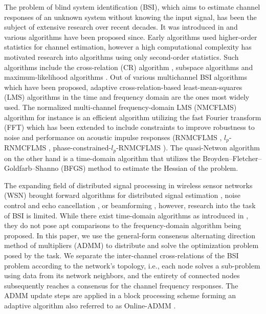 \documentclass{article}
\begin{document}
The problem of blind system identification (BSI), which aims to estimate channel responses of an unknown system without knowing the input signal, has been the subject of extensive research over recent decades.
It was introduced in \cite{satoMethodSelfRecoveringEqualization1975} and various algorithms have been proposed since.
Early algorithms used higher-order statistics \cite{godardSelfRecoveringEqualizationCarrier1980,tongNewApproachBlind1991,mendelTutorialHigherorderStatistics1991} for channel estimation, however a high computational complexity has motivated research into algorithms using only second-order statistics.
Such algorithms include the cross-relation (CR) algorithm \cite{langtongBlindIdentificationEqualization1994, guanghanxuLeastsquaresApproachBlind1995}, subspace algorithms \cite{moulinesSubspaceMethodsBlind1995,gannotSubspaceMethodsMultimicrophone2003,diamantarasEfficientSubspaceMethod2008,mayyalaStructureBasedSubspaceMethod2017} and maximum-likelihood algorithms \cite{yingbohuaFastMaximumLikelihood1996}.
Out of various multichannel BSI algorithms which have been proposed, adaptive cross-relation-based least-mean-squares (LMS) algorithms in the time and frequency domain are the ones most widely used.
The normalized multi-channel frequency-domain LMS (NMCFLMS) \cite{huangAdaptiveMultichannelLeast2002,huangClassFrequencydomainAdaptive2003} algorithm for instance is an efficient algorithm utilizing the fast Fourier transform (FFT) which has been extended to include constraints to improve robustness to noise and performance on acoustic impulse responses (RNMCFLMS \cite{huNoiseRobustBlind2015}, \(l_p\)-RNMCFLMS \cite{heNoiseRobustFrequencyDomain2018}, phase-constrained-\(l_p\)-RNMCFLMS \cite{joRobustBlindMultichannel2021}).
The quasi-Netwon algorithm \cite{habetsOnlineQuasiNewtonAlgorithm2010} on the other hand is a time-domain algorithm that utilizes the Broyden–Fletcher–Goldfarb–Shanno (BFGS) \cite{brodlie1977assessment} method to estimate the Hessian of the problem.

The expanding field of distributed signal processing in wireless sensor networks (WSN) brought forward algorithms for distributed signal estimation \cite{5483092}, noise control and echo cancellation \cite{9670697}, or beamforming \cite{6663655,9670697}, however, research into the task of BSI is limited.
While there exist time-domain algorithms as introduced in \cite{yuDistributedBlindSystem2014,liuDistributedBlindIdentification2016,liuDistributedRecursiveBlind2017}, they do not pose apt comparisons to the frequency-domain algorithm being proposed.
In this paper, we use the general-form consensus alternating direction method of multipliers (ADMM) \cite{boydDistributedOptimizationStatistical2011} to distribute and solve the optimization problem posed by the task.
We separate the inter-channel cross-relations of the BSI problem according to the network's topology, i.e., each node solves a sub-problem using data from its network neighbors, and the entirety of connected nodes subsequently reaches a consensus for the channel frequency responses.
The ADMM update steps are applied in a block processing scheme forming an adaptive algorithm also referred to as Online-ADMM \cite{wangOnlineAlternatingDirection2013,hosseiniOnlineDistributedADMM2014}.
\end{document}
